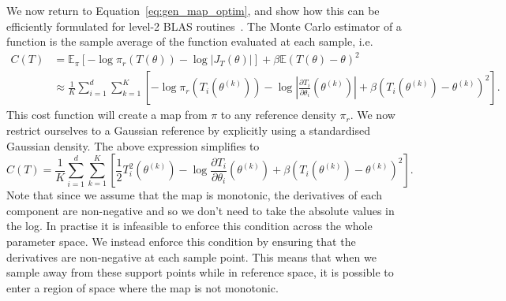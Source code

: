 \documentclass[final]{siamltex}
\begin{document}
We now return to Equation~\eqref{eq:gen_map_optim}, and show how this can be efficiently formulated
for level-2 BLAS routines~\cite{choi1992scalapack}. The Monte Carlo estimator of a function is the
sample average of the function evaluated at each sample, i.e.
\begin{align*}
	C(T) &= \mathbb{E}_\pi\left[ -\log\pi_r(T(\theta)) - \log|J_T(\theta)|\right] +
			\beta\mathbb{E}(T(\theta)-\theta)^2 \\
		&\approx \frac{1}{K}\sum\limits_{i=1}^d \! \sum\limits_{k=1}^K \left[-\log\pi_r(T_i(\theta^{(k)})) -
			\log\left|\frac{\partial T_i}{\partial \theta_i}(\theta^{(k)})\right| + \beta(T_i(\theta^{(k)})-\theta^{(k)})^2\right].
\end{align*}
This cost function will create a map from $\pi$ to any reference density $\pi_r$. We now restrict ourselves to a Gaussian reference by explicitly using a standardised Gaussian density. The above expression simplifies to
\begin{equation}\label{eq:gauss_map_optim}
	C(T) = \frac{1}{K}\sum\limits_{i=1}^d \! \sum\limits_{k=1}^K \left[\frac{1}{2}
		T_i^2(\theta^{(k)}) - \log\frac{\partial T_i}{\partial \theta_i}(\theta^{(k)}) +
		\beta(T_i(\theta^{(k)})-\theta^{(k)})^2\right].
\end{equation}
Note that since we assume that the map is monotonic, the derivatives of each component are
non-negative and so we don't need to take the absolute values in the log. In practise it is infeasible to enforce this condition across the whole parameter space. We instead enforce this condition by ensuring that the derivatives are non-negative at each sample point. This means that when we sample away from these support points while in reference space, it is possible to enter a region of space where the map is not monotonic.
\end{document}
